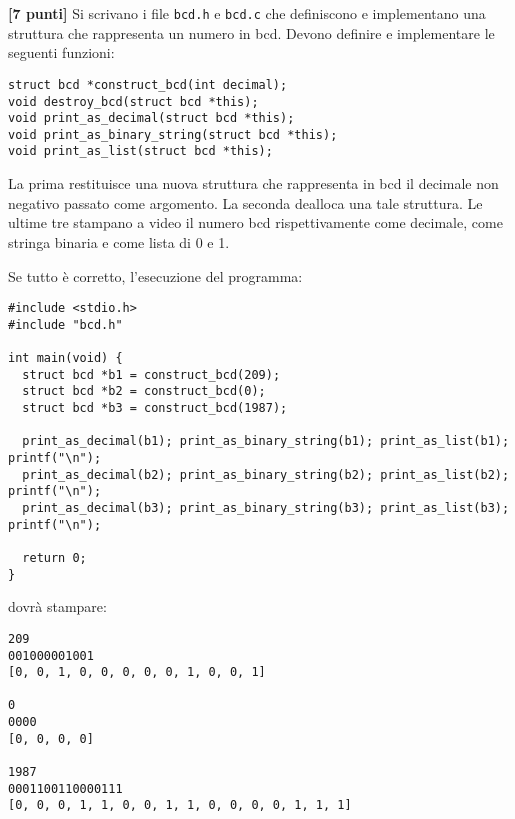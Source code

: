 \documentclass{article}[10pt]
\newcounter{esnu}
\newenvironment{esercizio}{\medskip \noindent {\bf Esercizio\addtocounter{esnu}{1} \arabic{esnu}}}{}
\begin{document}
\begin{esercizio}
\textbf{[7 punti]}
Si scrivano i file \texttt{bcd.h} e \texttt{bcd.c} che definiscono e implementano
una struttura che rappresenta un numero in bcd. Devono definire e implementare le
seguenti funzioni:

{\small
\begin{verbatim}
struct bcd *construct_bcd(int decimal);
void destroy_bcd(struct bcd *this);
void print_as_decimal(struct bcd *this);
void print_as_binary_string(struct bcd *this);
void print_as_list(struct bcd *this);
\end{verbatim}
}

\noindent
La prima restituisce una nuova struttura che rappresenta in bcd il decimale non negativo
passato come argomento. La seconda dealloca una tale struttura. Le ultime tre stampano a video il
numero bcd rispettivamente come decimale, come stringa binaria e come lista di 0 e 1.

Se tutto \`e corretto, l'esecuzione del programma:

{\small
\begin{verbatim}
#include <stdio.h>
#include "bcd.h"

int main(void) {
  struct bcd *b1 = construct_bcd(209);
  struct bcd *b2 = construct_bcd(0);
  struct bcd *b3 = construct_bcd(1987);

  print_as_decimal(b1); print_as_binary_string(b1); print_as_list(b1); printf("\n");
  print_as_decimal(b2); print_as_binary_string(b2); print_as_list(b2); printf("\n");
  print_as_decimal(b3); print_as_binary_string(b3); print_as_list(b3); printf("\n");

  return 0;
}
\end{verbatim}
}
\noindent
dovr\`a stampare:

{\small
\begin{verbatim}
209
001000001001
[0, 0, 1, 0, 0, 0, 0, 0, 1, 0, 0, 1]

0
0000
[0, 0, 0, 0]

1987
0001100110000111
[0, 0, 0, 1, 1, 0, 0, 1, 1, 0, 0, 0, 0, 1, 1, 1]
\end{verbatim}
}
%
\end{esercizio}
%
\end{document}
